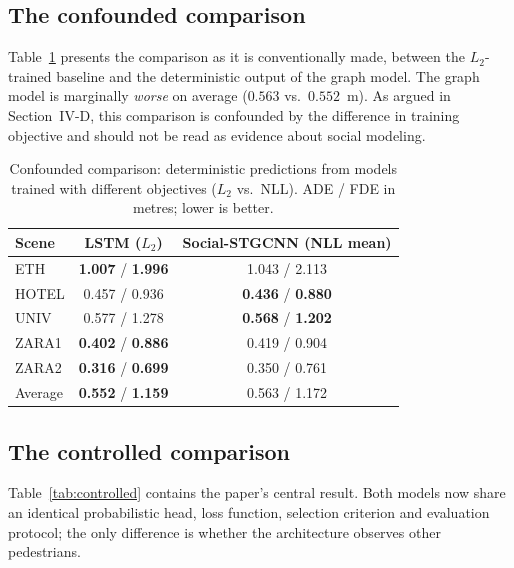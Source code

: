 \documentclass[conference]{IEEEtran}
\begin{document}
\subsection{The confounded comparison}

Table~\ref{tab:deterministic} presents the comparison as it is conventionally made,
between the $L_2$-trained baseline and the deterministic output of the graph model. The
graph model is marginally \emph{worse} on average ($0.563$ vs.\ $0.552$~m). As argued in
Section~IV-D, this comparison is confounded by the difference in training objective and
should not be read as evidence about social modeling.

\begin{table}[t]
\caption{Confounded comparison: deterministic predictions from models trained with
different objectives ($L_2$ vs.\ NLL). ADE / FDE in metres; lower is better.}
\label{tab:deterministic}
\centering
\small
\begin{tabular}{lcc}
\toprule
Scene & LSTM ($L_2$) & Social-STGCNN (NLL mean) \\
\midrule
ETH   & \textbf{1.007} / \textbf{1.996} & 1.043 / 2.113 \\
HOTEL & 0.457 / 0.936 & \textbf{0.436} / \textbf{0.880} \\
UNIV  & 0.577 / 1.278 & \textbf{0.568} / \textbf{1.202} \\
ZARA1 & \textbf{0.402} / \textbf{0.886} & 0.419 / 0.904 \\
ZARA2 & \textbf{0.316} / \textbf{0.699} & 0.350 / 0.761 \\
\midrule
Average & \textbf{0.552} / \textbf{1.159} & 0.563 / 1.172 \\
\bottomrule
\end{tabular}
\end{table}

\subsection{The controlled comparison}

Table~\ref{tab:controlled} contains the paper's central result. Both models now share an
identical probabilistic head, loss function, selection criterion and evaluation protocol;
the only difference is whether the architecture observes other pedestrians.
\end{document}
